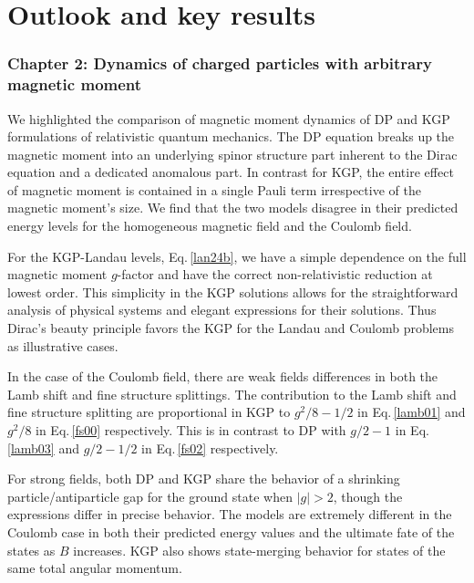 \chapter{Outlook and key results}
\label{chap:outlook}

\subsection*{Chapter 2: Dynamics of charged particles with arbitrary magnetic moment}
\label{sec:chap2}
We highlighted the comparison of magnetic moment dynamics of DP and KGP formulations of relativistic quantum mechanics. The DP equation breaks up the magnetic moment into an underlying spinor structure part inherent to the Dirac equation and a dedicated anomalous part. In contrast for KGP, the entire effect of magnetic moment is contained in a single Pauli term irrespective of the magnetic moment's size. We find that the two models disagree in their predicted energy levels for the homogeneous magnetic field and the Coulomb field.

For the KGP-Landau levels, Eq.\,\eqref{lan24b}, we have a simple dependence on the full magnetic moment $g$-factor and have the correct non-relativistic reduction at lowest order. This simplicity in the KGP solutions allows for the straightforward analysis of physical systems and elegant expressions for their solutions. Thus Dirac's beauty principle favors the KGP for the Landau and Coulomb problems as illustrative cases.

In the case of the Coulomb field, there are weak fields differences in both the Lamb shift and fine structure splittings. The contribution to the Lamb shift and fine structure splitting are proportional in KGP to $g^{2}/8-1/2$ in Eq.\,\eqref{lamb01} and $g^{2}/8$ in Eq.\,\eqref{fs00} respectively. This is in contrast to DP with $g/2-1$ in Eq.\,\eqref{lamb03} and $g/2-1/2$ in Eq.\,\eqref{fs02} respectively.

For strong fields, both DP and KGP share the behavior of a shrinking particle/antiparticle gap for the ground state when $|g|>2$, though the expressions differ in precise behavior. The models are extremely different in the Coulomb case in both their predicted energy values and the ultimate fate of the states as $B$ increases. KGP also shows state-merging behavior for states of the same total angular momentum.

